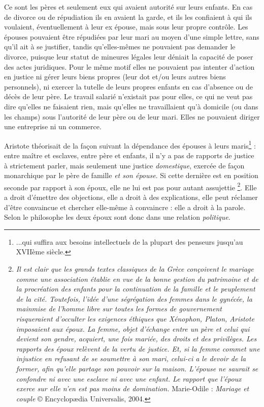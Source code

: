 Ce sont les pères et seulement eux qui avaient autorité
sur leurs enfants. En cas de divorce ou de répudiation ils en avaient la
garde, et ils les confiaient à qui ils voulaient, éventuellement à leur ex
épouse, mais sous leur propre contrôle. Les épouses pouvaient
être répudiées par leur mari au moyen d'une simple lettre, sans qu'il ait
à se justifier, tandis qu'elles-mêmes ne pouvaient pas demander le divorce,
puisque leur statut de mineures légales leur déniait la capacité de poser des actes juridiques. Pour le même motif elles ne pouvaient
pas intenter d'action en justice ni gérer leurs biens propres
(leur dot et/ou leurs autres biens personnels), ni exercer la tutelle de leurs propres enfants en cas d'absence ou de décès de leur père. Le travail salarié
n'existait pas pour elles, ce qui ne veut pas dire qu'elles ne faisaient
rien, mais qu'elles ne travaillaient
qu'à domicile (ou dans les champs) sous l'autorité de leur père ou de leur mari.  Elles ne pouvaient
diriger une entreprise ni un commerce. 

 Aristote théorisait de la façon suivant la dépendance des épouses à leurs maris\footnote{...qui suffira aux besoins intellectuels de la plupart des penseurs jusqu'au XVIIème siècle.} : entre maître et esclaves, entre père et enfants, il n'y
a pas de rapports de justice à strictement parler, mais seulement une
justice \emph{domestique}, exercée de façon monarchique par le père de famille \emph{et
son épouse}. Si cette dernière est en position seconde par rapport à son
époux, elle ne lui est pas pour autant assujettie%
\footnote{{\emph{Il est clair que les grands textes classiques de la Grèce conçoivent le mariage comme une association établie en vue de la bonne gestion du patrimoine et de la procréation des enfants pour la continuation de la famille et le peuplement de la cité. Toutefois, l'idée d'une ségrégation des femmes dans le gynécée, la mainmise de l'homme libre sur toutes les formes de gouvernement risqueraient d'occulter les exigences éthiques que Xénophon, Platon, Aristote imposaient aux époux. La femme, objet d'échange entre un père et celui qui devient son gendre, acquiert, une fois mariée, des droits et des privilèges. Les rapports des époux relèvent de la vertu de justice. Et, si la femme commet une injustice en refusant de se soumettre à son mari, celui-ci a le devoir de la former, afin qu'elle partage son pouvoir sur la maison. L'épouse ne saurait se confondre ni avec une esclave ni avec une enfant. Le rapport que l'époux exerce sur elle n'en est pas moins de domination.}}
Marie-Odile  : \emph{Mariage et couple} © Encyclopædia Universalis, 2004.}.
Elle a droit
d'émettre des objections, elle a droit à des explications, elle peut
réclamer d'être convaincue et chercher elle-même à convaincre : elle a
droit à la parole. Selon le philosophe les deux époux sont donc dans
une relation \emph{politique}. 


